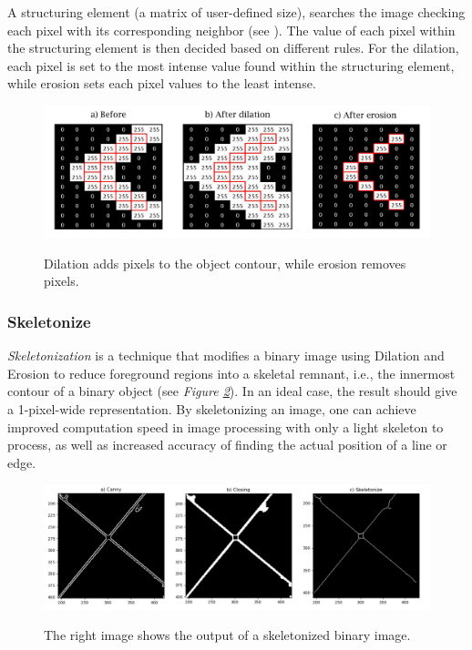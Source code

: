 \noindent A structuring element (a matrix of user-defined size), searches the image checking each pixel with its corresponding neighbor (see ). The value of each pixel within the structuring element is then decided based on different rules. For the dilation, each pixel is set to the most intense value found within the structuring element, while erosion sets each pixel values to the least intense. 

\begin{center}
\begin{figure}[H]
    \centering
    \includegraphics[width=1\linewidth]{figures/PDF/Morphological_dilate_erode.pdf}\\
    \caption{Dilation adds pixels to the object contour, while erosion
    removes pixels.}
    \label{fig:dilate and erode}
\end{figure}
\end{center}

\subsubsection{Skeletonize}
\textit{Skeletonization}\cite{Rakesh} is a technique that modifies a binary image using Dilation and Erosion to reduce foreground regions into a skeletal remnant, i.e., the innermost contour of a binary object (see \textit{Figure \ref{fig:skeletonize}}). In an ideal case, the result should give a 1-pixel-wide representation. By skeletonizing an image, one can achieve improved computation speed in image processing with only a light skeleton to process, as well as increased accuracy of finding the actual position of a line or edge.

\begin{figure}[H]
    \centering
    \includegraphics[width=0.8\linewidth]{figures/PDF/Skeletonize.pdf}\\
    \caption{The right image shows the output of a skeletonized binary image.}
    \label{fig:skeletonize}
\end{figure}

